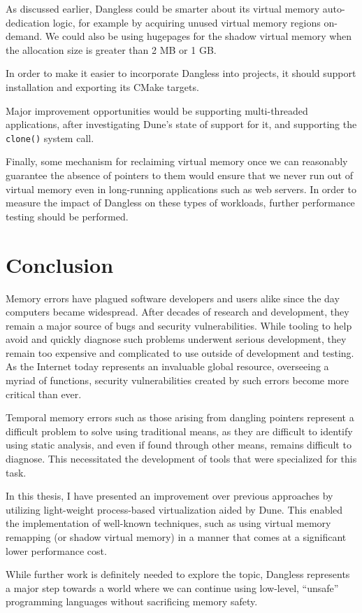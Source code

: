 As discussed earlier, Dangless could be smarter about its virtual memory auto-dedication logic, for example by acquiring unused virtual memory regions on-demand. We could also be using hugepages for the shadow virtual memory when the allocation size is greater than 2 MB or 1 GB.

In order to make it easier to incorporate Dangless into projects, it should support installation and exporting its CMake targets.

Major improvement opportunities would be supporting multi-threaded applications, after investigating Dune's state of support for it, and supporting the \lstinline!clone()! system call.

Finally, some mechanism for reclaiming virtual memory once we can reasonably guarantee the absence of pointers to them would ensure that we never run out of virtual memory even in long-running applications such as web servers. In order to measure the impact of Dangless on these types of workloads, further performance testing should be performed.

\section{Conclusion}

Memory errors have plagued software developers and users alike since the day computers became widespread. After decades of research and development, they remain a major source of bugs and security vulnerabilities. While tooling to help avoid and quickly diagnose such problems underwent serious development, they remain too expensive and complicated to use outside of development and testing. As the Internet today represents an invaluable global resource, overseeing a myriad of functions, security vulnerabilities created by such errors become more critical than ever.

Temporal memory errors such as those arising from dangling pointers represent a difficult problem to solve using traditional means, as they are difficult to identify using static analysis, and even if found through other means, remains difficult to diagnose. This necessitated the development of tools that were specialized for this task.

In this thesis, I have presented an improvement over previous approaches by utilizing light-weight process-based virtualization aided by Dune. This enabled the implementation of well-known techniques, such as using virtual memory remapping (or shadow virtual memory) in a manner that comes at a significant lower performance cost.

While further work is definitely needed to explore the topic, Dangless represents a major step towards a world where we can continue using low-level, ``unsafe'' programming languages without sacrificing memory safety.
